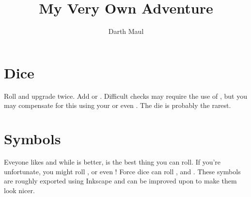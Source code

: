 \documentclass[a4paper]{article}
\title{My Very Own Adventure}
\author{Darth Maul}
\begin{document}
\maketitle

\section{Dice}

Roll \difficulty\difficulty and upgrade twice. Add \boost or \setback\setback.
Difficult checks may require the use of \challenge, but you may compensate for
this using your \ability\ability or even \proficiency. The \force die is
probably the rarest.

\section{Symbols}

Eveyone likes \success and while \advantage is better, \triumph is the best
thing you can roll. If you're unfortunate, you might roll \failure, \threat or
even \despair! Force dice can roll \light, \dark and \darklight. These symbols
are roughly exported using Inkscape and can be improved upon to make them look
nicer.
\end{document}

